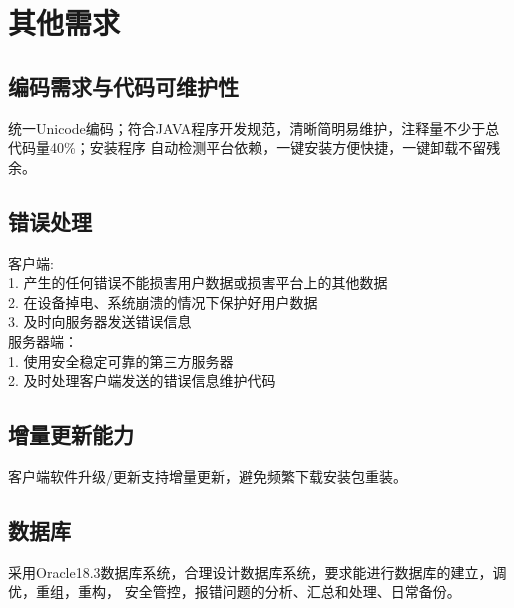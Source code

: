 \chapter{\color{red}其他需求}
\section{编码需求与代码可维护性}
    统一Unicode编码；符合JAVA程序开发规范，清晰简明易维护，注释量不少于总代码量40\%；安装程序
    自动检测平台依赖，一键安装方便快捷，一键卸载不留残余。
\section{错误处理}
\noindent
    客户端: \\
        1. 产生的任何错误不能损害用户数据或损害平台上的其他数据\\
        2. 在设备掉电、系统崩溃的情况下保护好用户数据\\
        3. 及时向服务器发送错误信息\\
    服务器端：\\
        1. 使用安全稳定可靠的第三方服务器\\
        2. 及时处理客户端发送的错误信息维护代码
\section{增量更新能力}
    客户端软件升级/更新支持增量更新，避免频繁下载安装包重装。
\section{数据库}
    采用Oracle18.3数据库系统，合理设计数据库系统，要求能进行数据库的建立，调优，重组，重构，
    安全管控，报错问题的分析、汇总和处理、日常备份。

